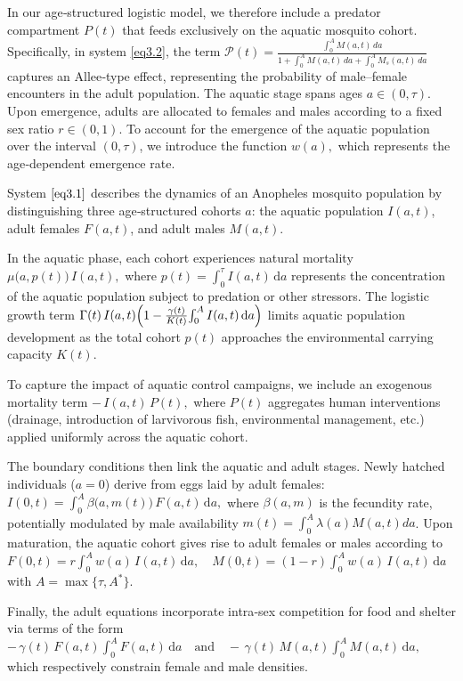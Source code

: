 \documentclass[10pt, a4paper]{amsart}
\theoremstyle{plain}
\theoremstyle{definition}
\theoremstyle{remark}
\numberwithin{equation}{section}
\begin{document}
In our age‐structured logistic model, we therefore include a predator compartment $P(t)$ that feeds exclusively on the aquatic mosquito cohort. Specifically, in system \eqref{eq3.2}, the term $
\mathcal{P}(t)
=\frac{\displaystyle\int_{0}^{A}M(a,t)\,da}{1+\displaystyle\int_{0}^{A}M(a,t)\,da+\displaystyle\int_{0}^{A}M_s(a,t)\,da}$ captures an Allee‐type effect, representing the probability of male–female encounters in the adult population. The aquatic stage spans ages $a\in(0,\tau)$. Upon emergence, adults are allocated to females and males according to a fixed sex ratio $r\in(0,1)$.  To account for the emergence of the aquatic population over the interval $(0,\tau)$, we introduce the function $w(a),$ which represents the age‑dependent emergence rate.


 System $\eqref{eq3.1}$ describes the dynamics of an Anopheles mosquito population by distinguishing three age‑structured cohorts $a$: the aquatic population $I(a,t)$, adult females $F(a,t)$, and adult males $M(a,t)$.

 In the aquatic phase, each cohort experiences natural mortality $\mu\bigl(a,p(t)\bigr)\,I(a,t),$
 where $p(t)=\int_{0}^{\tau}I(a,t)\,\mathrm{d}a$ represents the concentration of the aquatic population subject to predation or other stressors. The logistic growth term $ \Gamma(t)\,I(a,t)\Bigl(1-\tfrac{\gamma(t)}{K(t)}\!\int_{0}^{A}I(a,t)\,\mathrm{d}a\Bigr)$
 limits aquatic population development as the total cohort $p(t)$ approaches the environmental carrying capacity $K(t)$.

 To capture the impact of aquatic control campaigns, we include an exogenous mortality term $
 -\,I(a,t)\,P(t),$
 where $P(t)$ aggregates human interventions (drainage, introduction of larvivorous fish, environmental management, etc.) applied uniformly across the aquatic cohort.

 The boundary conditions then link the aquatic and adult stages. Newly hatched individuals ($a=0$) derive from eggs laid by adult females: $
I(0,t)=\int_{0}^{A}\beta\bigl(a,m(t)\bigr)\,F(a,t)\,\mathrm{d}a,$  where $\beta(a,m)$ is the fecundity rate, potentially modulated by male availability $m(t)=\displaystyle\int_{0}^A\lambda(a)M(a,t)da$.
 Upon maturation, the aquatic cohort gives rise to adult females or males according to $
 F(0,t)=r\displaystyle\int_{0}^{A}w(a)\,I(a,t)\,\mathrm{d}a,
 \quad
 M(0,t)=(1-r)\displaystyle\int_{0}^{A}w(a)\,I(a,t)\,\mathrm{d}a$ with $A=\max\lbrace\tau,A^*\rbrace.$

 Finally, the adult equations incorporate intra‑sex competition for food and shelter via terms of the form $
 -\,\gamma(t)\,F(a,t)\int_{0}^{A}F(a,t)\,\mathrm{d}a
 \quad\text{and}\quad
 -\,\gamma(t)\,M(a,t)\int_{0}^{A}M(a,t)\,\mathrm{d}a,$ which respectively constrain female and male densities.
\end{document}
